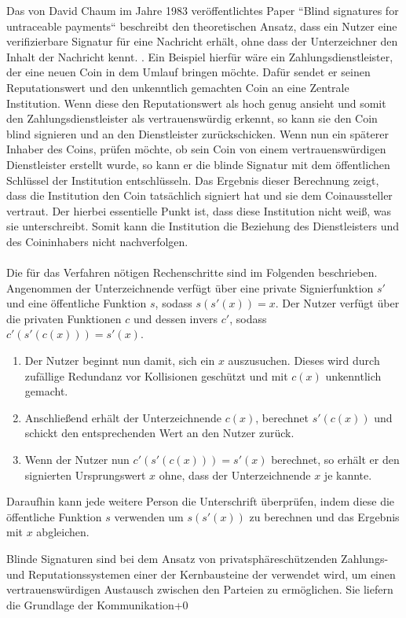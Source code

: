 \documentclass[11pt,a4paper]{scrreprt}
\begin{document}
Das von David Chaum im Jahre 1983 veröffentlichtes Paper ``Blind signatures for untraceable payments`` beschreibt den theoretischen Ansatz, dass ein Nutzer eine verifizierbare Signatur für eine Nachricht erhält, ohne dass der Unterzeichner den Inhalt der Nachricht kennt. \cite{chaum1983blind}. Ein Beispiel hierfür wäre ein Zahlungsdienstleister, der eine neuen Coin in dem Umlauf bringen möchte. Dafür sendet er seinen Reputationswert und den unkenntlich gemachten Coin an eine Zentrale Institution. Wenn diese den Reputationswert als hoch genug ansieht und somit den Zahlungsdienstleister als vertrauenswürdig erkennt, so kann sie den Coin blind signieren und an den Dienstleister zurückschicken. Wenn nun ein späterer Inhaber des Coins, prüfen möchte, ob sein Coin von einem vertrauenswürdigen Dienstleister erstellt wurde, so kann er die blinde Signatur mit dem öffentlichen Schlüssel der Institution entschlüsseln. Das Ergebnis dieser Berechnung zeigt, dass die Institution den Coin tatsächlich signiert hat und sie dem Coinaussteller vertraut. Der hierbei essentielle Punkt ist, dass diese Institution nicht weiß, was sie unterschreibt. Somit kann die Institution die Beziehung des Dienstleisters und des Coininhabers nicht nachverfolgen. 
\\\\
Die für das Verfahren nötigen Rechenschritte sind im Folgenden beschrieben. Angenommen der Unterzeichnende verfügt über eine private Signierfunktion $s'$ und eine öffentliche Funktion $s$, sodass $s(s'(x)) = x$. Der Nutzer verfügt über die privaten Funktionen $c$ und dessen invers $c'$, sodass $c'(s'(c(x))) = s'(x)$. 
\begin{enumerate}
    \item Der Nutzer beginnt nun damit, sich ein $x$ auszusuchen. Dieses wird durch zufällige Redundanz vor Kollisionen geschützt und mit $c(x)$ unkenntlich gemacht.
    \item Anschließend erhält der Unterzeichnende $c(x)$, berechnet $s'(c(x))$ und schickt den entsprechenden Wert an den Nutzer zurück.
    \item Wenn der Nutzer nun $c'(s'(c(x))) = s'(x)$ berechnet, so erhält er den signierten Ursprungswert $x$ ohne, dass der Unterzeichnende $x$ je kannte.
\end{enumerate}
Daraufhin kann jede weitere Person die Unterschrift überprüfen, indem diese die öffentliche Funktion $s$ verwenden um $s(s'(x))$ zu berechnen und das Ergebnis mit $x$ abgleichen. 

Blinde Signaturen sind bei dem Ansatz von privatsphäreschützenden Zahlungs- und Reputationssystemen einer der Kernbausteine der verwendet wird, um einen vertrauenswürdigen Austausch zwischen den Parteien zu ermöglichen. Sie liefern die Grundlage der Kommunikation+0
\end{document}
